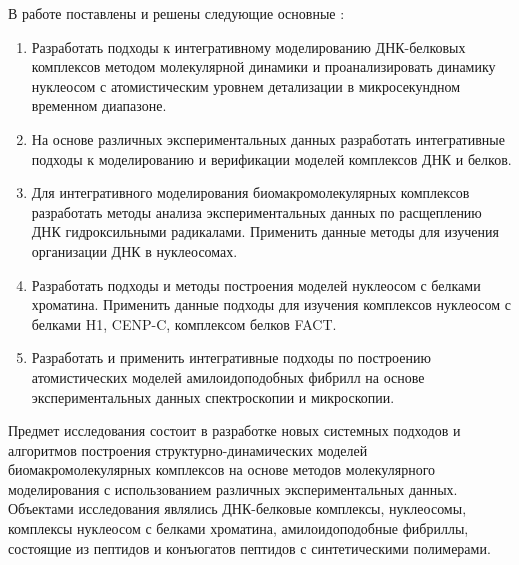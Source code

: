 В работе поставлены и решены следующие основные {\tasks}:
\begin{enumerate}

  \item Разработать подходы к интегративному моделированию ДНК-белковых комплексов методом молекулярной динамики и проанализировать динамику нуклеосом с атомистическим уровнем детализации в микросекундном временном диапазоне.


  \item На основе различных экспериментальных данных разработать интегративные подходы к моделированию и верификации моделей комплексов ДНК и белков.

  

  \item Для интегративного моделирования биомакромолекулярных комплексов разработать методы анализа экспериментальных данных по расщеплению ДНК гидроксильными радикалами. Применить данные методы для изучения организации ДНК в нуклеосомах. 

  
  \item Разработать подходы и методы построения моделей нуклеосом с белками хроматина. Применить данные подходы для изучения комплексов нуклеосом с белками H1, CENP-C, комплексом белков FACT.

   \item Разработать и применить интегративные подходы по построению атомистических моделей амилоидоподобных фибрилл на основе экспериментальных данных спектроскопии и микроскопии.
\end{enumerate}

{\object}
Предмет исследования состоит в разработке новых системных подходов и алгоритмов построения структурно-динамических моделей биомакромолекулярных комплексов на основе методов молекулярного моделирования с использованием различных экспериментальных данных.
Объектами исследования являлись ДНК-белковые комплексы, нуклеосомы, комплексы нуклеосом с белками хроматина, амилоидоподобные фибриллы, состоящие из пептидов и конъюгатов пептидов с синтетическими полимерами.

